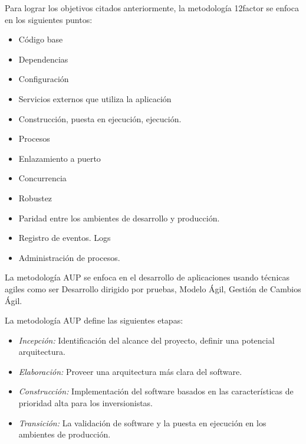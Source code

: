 \noindent Para lograr los objetivos citados anteriormente, la metodología 12factor se enfoca en los siguientes puntos: 
\begin{itemize}
  \item Código base
  \item Dependencias
  \item Configuración
  \item Servicios externos que utiliza la aplicación
  \item Construcción, puesta en ejecución, ejecución.
  \item Procesos
  \item Enlazamiento a puerto
  \item Concurrencia
  \item Robustez
  \item Paridad entre los ambientes de desarrollo y producción.
  \item Registro de eventos. Logs
  \item Administración de procesos.
\end{itemize}

\noindent La metodología AUP se enfoca en el desarrollo de aplicaciones usando técnicas agiles como ser Desarrollo dirigido por pruebas,  Modelo Ágil, Gestión de Cambios Ágil.

\noindent La metodología AUP define las siguientes etapas:

\begin{itemize}
  \item \textit{Incepción:} Identificación del alcance del proyecto, definir una potencial arquitectura.
  \item \textit{Elaboración:} Proveer una arquitectura más clara del software.
  \item \textit{Construcción:} Implementación del software basados en las características de prioridad alta para los inversionistas. 
  \item \textit{Transición:} La validación de software y la puesta en ejecución en los ambientes de producción.
\end{itemize}

